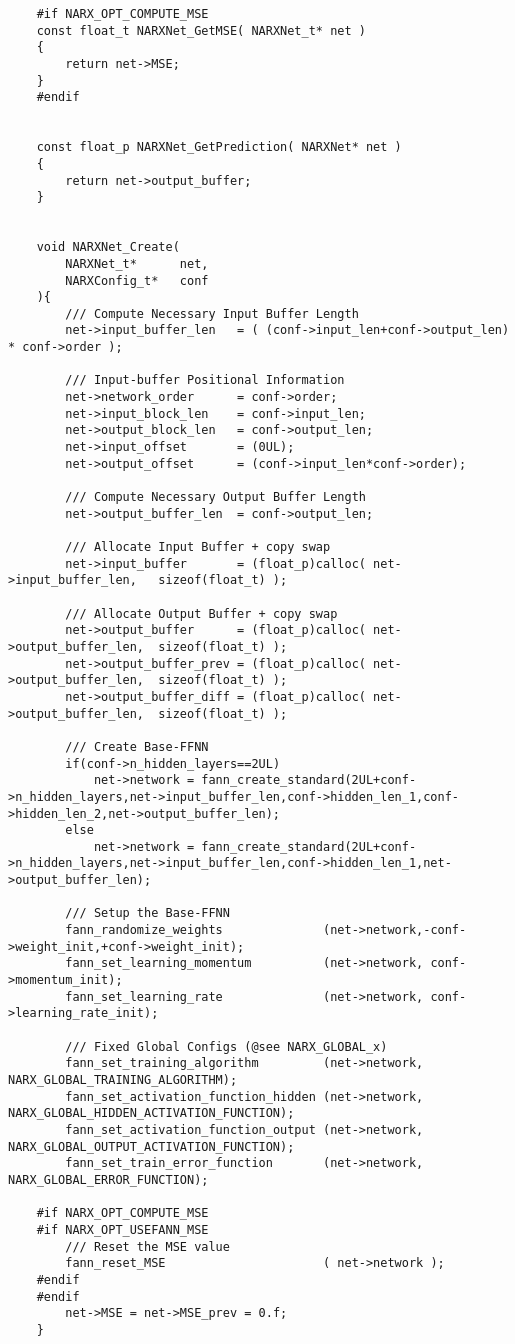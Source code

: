 \begin{lstlisting}
	#if NARX_OPT_COMPUTE_MSE
	const float_t NARXNet_GetMSE( NARXNet_t* net )
	{
		return net->MSE;
	}
	#endif


	const float_p NARXNet_GetPrediction( NARXNet* net )
	{
		return net->output_buffer;
	}


	void NARXNet_Create( 
		NARXNet_t*		net, 
		NARXConfig_t*	conf
	){
		/// Compute Necessary Input Buffer Length
		net->input_buffer_len	= ( (conf->input_len+conf->output_len) * conf->order );
		
		/// Input-buffer Positional Information
		net->network_order		= conf->order;
		net->input_block_len	= conf->input_len;
		net->output_block_len	= conf->output_len;
		net->input_offset		= (0UL);
		net->output_offset		= (conf->input_len*conf->order);

		/// Compute Necessary Output Buffer Length
		net->output_buffer_len	= conf->output_len;
		
		/// Allocate Input Buffer + copy swap
		net->input_buffer		= (float_p)calloc( net->input_buffer_len,	sizeof(float_t) );

		/// Allocate Output Buffer + copy swap
		net->output_buffer		= (float_p)calloc( net->output_buffer_len,	sizeof(float_t) );
		net->output_buffer_prev	= (float_p)calloc( net->output_buffer_len,	sizeof(float_t) );
		net->output_buffer_diff	= (float_p)calloc( net->output_buffer_len,	sizeof(float_t) );

		/// Create Base-FFNN
		if(conf->n_hidden_layers==2UL)
			net->network = fann_create_standard(2UL+conf->n_hidden_layers,net->input_buffer_len,conf->hidden_len_1,conf->hidden_len_2,net->output_buffer_len);
		else
			net->network = fann_create_standard(2UL+conf->n_hidden_layers,net->input_buffer_len,conf->hidden_len_1,net->output_buffer_len);
		
		/// Setup the Base-FFNN
		fann_randomize_weights				(net->network,-conf->weight_init,+conf->weight_init);
		fann_set_learning_momentum			(net->network, conf->momentum_init);
		fann_set_learning_rate				(net->network, conf->learning_rate_init);

		/// Fixed Global Configs (@see NARX_GLOBAL_x) 
		fann_set_training_algorithm			(net->network, NARX_GLOBAL_TRAINING_ALGORITHM);
		fann_set_activation_function_hidden	(net->network, NARX_GLOBAL_HIDDEN_ACTIVATION_FUNCTION);
		fann_set_activation_function_output	(net->network, NARX_GLOBAL_OUTPUT_ACTIVATION_FUNCTION);
		fann_set_train_error_function		(net->network, NARX_GLOBAL_ERROR_FUNCTION);

	#if NARX_OPT_COMPUTE_MSE
	#if NARX_OPT_USEFANN_MSE
		/// Reset the MSE value
		fann_reset_MSE						( net->network );
	#endif
	#endif
		net->MSE = net->MSE_prev = 0.f;
	}




\end{lstlisting}
